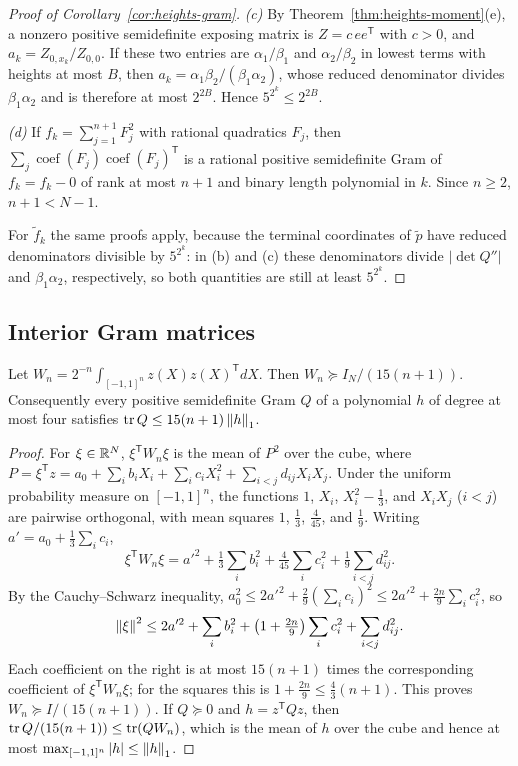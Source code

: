 \begin{proof}[Proof of Corollary~\ref{cor:heights-gram}]
\emph{(c)} By Theorem~\ref{thm:heights-moment}(e), a nonzero positive
semidefinite exposing matrix is $Z=c\,ee^{\mathsf T}$ with $c>0$, and
$a_k=Z_{0,x_k}/Z_{0,0}$. If these two entries are $\alpha_1/\beta_1$ and
$\alpha_2/\beta_2$ in lowest terms with heights at most $B$, then
$a_k=\alpha_1\beta_2/(\beta_1\alpha_2)$, whose reduced denominator divides
$\beta_1\alpha_2$ and is therefore at most $2^{2B}$. Hence
$5^{2^k}\le2^{2B}$.

\emph{(d)} If $f_k=\sum_{j=1}^{n+1}F_j^2$ with rational quadratics $F_j$, then
$\sum_j\operatorname{coef}(F_j)\operatorname{coef}(F_j)^{\mathsf T}$ is a
rational positive semidefinite Gram of $f_k=f_k-0$ of rank at most $n+1$ and
binary length polynomial in $k$. Since $n\ge2$, $n+1<N-1$.

For $\tilde f_k$ the same proofs apply, because the terminal coordinates of
$\tilde p$ have reduced denominators divisible by $5^{2^k}$: in (b) and (c)
these denominators divide $|\det Q''|$ and $\beta_1\alpha_2$, respectively, so
both quantities are still at least $5^{2^k}$.
\end{proof}

\subsection{Interior Gram matrices}
\label{app:heights-interior}

\begin{lemma}
\label{lem:heights-cube-moments}
Let $W_n=2^{-n}\int_{[-1,1]^n}z(X)z(X)^{\mathsf T}dX$. Then
$W_n\succeq I_N/(15(n+1))$. Consequently every positive semidefinite Gram
$Q$ of a polynomial $h$ of degree at most four satisfies
$\operatorname{tr} Q\le15(n+1)\left\lVert h\right\rVert_1$.
\end{lemma}

\begin{proof}
For $\xi\in\mathbb R^N$, $\xi^{\mathsf T}W_n\xi$ is the mean of $P^2$ over the cube,
where $P=\xi^{\mathsf T}z=a_0+\sum_ib_iX_i+\sum_ic_iX_i^2
+\sum_{i<j}d_{ij}X_iX_j$. Under the uniform probability measure on
$[-1,1]^n$, the functions $1$, $X_i$, $X_i^2-\frac13$, and $X_iX_j$ ($i<j$)
are pairwise orthogonal, with mean squares $1$, $\frac13$, $\frac4{45}$, and
$\frac19$. Writing $a'=a_0+\frac13\sum_ic_i$,
\[
 \xi^{\mathsf T}W_n\xi=a'^2+\tfrac13\sum_ib_i^2+\tfrac4{45}\sum_ic_i^2
   +\tfrac19\sum_{i<j}d_{ij}^2 .
\]
By the Cauchy--Schwarz inequality,
$a_0^2\le2a'^2+\frac29(\sum_ic_i)^2\le2a'^2+\frac{2n}9\sum_ic_i^2$, so
\[
 \left\lVert\xi\right\rVert^2\le2a'^2+\sum_ib_i^2+\bigl(1+\tfrac{2n}9\bigr)\sum_ic_i^2
   +\sum_{i<j}d_{ij}^2 .
\]
Each coefficient on the right is at most $15(n+1)$ times the corresponding
coefficient of $\xi^{\mathsf T}W_n\xi$; for the squares this is
$1+\frac{2n}9\le\frac43(n+1)$. This proves $W_n\succeq I/(15(n+1))$. If
$Q\succeq0$ and $h=z^{\mathsf T}Qz$, then
$\operatorname{tr} Q/(15(n+1))\le\operatorname{tr}(QW_n)$, which is the mean of $h$ over the cube and
hence at most $\max_{[-1,1]^n}|h|\le\left\lVert h\right\rVert_1$.
\end{proof}

